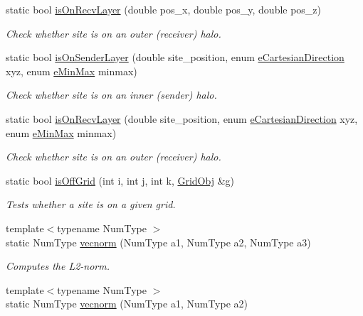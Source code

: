 \begin{DoxyCompactItemize}
static bool \hyperlink{class_grid_utils_abfec29d90b6942de2f3c52c225a4d888}{is\+On\+Recv\+Layer} (double pos\+\_\+x, double pos\+\_\+y, double pos\+\_\+z)
\begin{DoxyCompactList}\small\item\em Check whether site is on an outer (receiver) halo. \end{DoxyCompactList}\item 
static bool \hyperlink{class_grid_utils_a70a234125350fca607d3943e0f1edd7c}{is\+On\+Sender\+Layer} (double site\+\_\+position, enum \hyperlink{_grid_utils_8h_afbad8e4a2f1e9903755b1bd2fe8273cf}{e\+Cartesian\+Direction} xyz, enum \hyperlink{_grid_utils_8h_a8e005b039da2246588381c4feeeac43f}{e\+Min\+Max} minmax)
\begin{DoxyCompactList}\small\item\em Check whether site is on an inner (sender) halo. \end{DoxyCompactList}\item 
static bool \hyperlink{class_grid_utils_af2b6e1225cab2a840110e2a70f6bd23c}{is\+On\+Recv\+Layer} (double site\+\_\+position, enum \hyperlink{_grid_utils_8h_afbad8e4a2f1e9903755b1bd2fe8273cf}{e\+Cartesian\+Direction} xyz, enum \hyperlink{_grid_utils_8h_a8e005b039da2246588381c4feeeac43f}{e\+Min\+Max} minmax)
\begin{DoxyCompactList}\small\item\em Check whether site is on an outer (receiver) halo. \end{DoxyCompactList}\item 
static bool \hyperlink{class_grid_utils_a48709fd0b88db1e79bbc3a12026fe33a}{is\+Off\+Grid} (int i, int j, int k, \hyperlink{class_grid_obj}{Grid\+Obj} \&g)
\begin{DoxyCompactList}\small\item\em Tests whether a site is on a given grid. \end{DoxyCompactList}\item 
{\footnotesize template$<$typename Num\+Type $>$ }\\static Num\+Type \hyperlink{class_grid_utils_a78aa4876d7066bce253c52457e7b901d}{vecnorm} (Num\+Type a1, Num\+Type a2, Num\+Type a3)
\begin{DoxyCompactList}\small\item\em Computes the L2-\/norm. \end{DoxyCompactList}\item 
{\footnotesize template$<$typename Num\+Type $>$ }\\static Num\+Type \hyperlink{class_grid_utils_a7a169fc043a585f20936b314def45fe7}{vecnorm} (Num\+Type a1, Num\+Type a2)

\end{DoxyCompactItemize}
